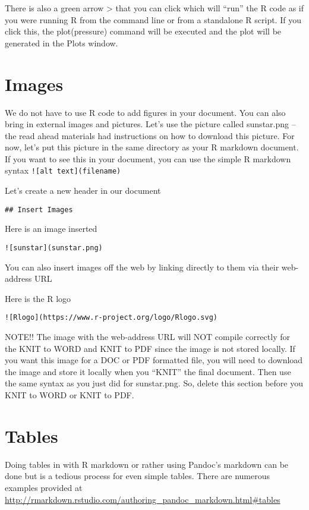 \documentclass[
]{book}
\begin{document}
There is also a green arrow \textgreater{} that you can click which will ``run'' the R code as if you were running R from the command line or from a standalone R script. If you click this, the plot(pressure) command will be executed and the plot will be generated in the Plots window.

\hypertarget{images}{%
\section{Images}\label{images}}

We do not have to use R code to add figures in your document. You can also bring in external images and pictures. Let's use the picture called sunstar.png -- the read ahead materials had instructions on how to download this picture. For now, let's put this picture in the same directory as your R markdown document. If you want to see this in your document, you can use the simple R markdown syntax \texttt{!{[}alt\ text{]}(filename)}

Let's create a new header in our document

\texttt{\#\#\ Insert\ Images}

Here is an image inserted

\texttt{!{[}sunstar{]}(sunstar.png)}

You can also insert images off the web by linking directly to them via their web-address URL

Here is the R logo

\texttt{!{[}Rlogo{]}(https://www.r-project.org/logo/Rlogo.svg)}

NOTE!! The image with the web-address URL will NOT compile correctly for the KNIT to WORD and KNIT to PDF since the image is not stored locally. If you want this image for a DOC or PDF formatted file, you will need to download the image and store it locally when you ``KNIT'' the final document. Then use the same syntax as you just did for sunstar.png. So, delete this section before you KNIT to WORD or KNIT to PDF.

\hypertarget{tables}{%
\section{Tables}\label{tables}}

Doing tables in with R markdown or rather using Pandoc's markdown can be done but is a tedious process for even simple tables. There are numerous examples provided at \url{http://rmarkdown.rstudio.com/authoring_pandoc_markdown.html\#tables}
\end{document}

